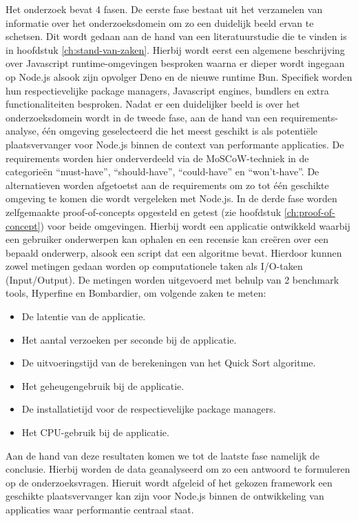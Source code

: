 Het onderzoek bevat 4 fasen. 
De eerste fase bestaat uit het verzamelen van informatie over het onderzoeksdomein om zo een duidelijk beeld ervan te schetsen.
Dit wordt gedaan aan de hand van een literatuurstudie die te vinden is in hoofdstuk \ref{ch:stand-van-zaken}. 
Hierbij wordt eerst een algemene beschrijving over Javascript runtime-omgevingen besproken waarna 
er dieper wordt ingegaan op Node.js alsook zijn opvolger Deno en de nieuwe runtime Bun. 
Specifiek worden hun respectievelijke package managers, Javascript engines, bundlers en extra functionaliteiten besproken.
Nadat er een duidelijker beeld is over het onderzoeksdomein wordt in de tweede fase, aan de hand van een requirements-analyse, 
één omgeving geselecteerd die het meest geschikt is als potentiële plaatsvervanger voor Node.js binnen de context van performante applicaties.
De requirements worden hier onderverdeeld via de MoSCoW-techniek in de categorieën “must-have”, “should-have”, “could-have” en “won't-have”. 
De alternatieven worden afgetoetst aan de requirements om zo tot één geschikte omgeving te komen die wordt vergeleken met Node.js.
In de derde fase worden zelfgemaakte proof-of-concepts opgesteld en getest (zie hoofdstuk \ref{ch:proof-of-concept}) voor beide omgevingen. 
Hierbij wordt een applicatie ontwikkeld waarbij een gebruiker onderwerpen kan ophalen en 
een recensie kan creëren over een bepaald onderwerp,
alsook een script dat een algoritme bevat. Hierdoor kunnen zowel metingen gedaan worden op computationele taken als I/O-taken (Input/Output).
De metingen worden uitgevoerd met behulp van 2 benchmark tools, Hyperfine en Bombardier, om volgende zaken te meten:
\begin{itemize}
    \item De latentie van de applicatie.
    \item Het aantal verzoeken per seconde bij de applicatie.
    \item De uitvoeringstijd van de berekeningen van het Quick Sort algoritme.
    \item Het geheugengebruik bij de applicatie.
    \item De installatietijd voor de respectievelijke package managers.
    \item Het CPU-gebruik bij de applicatie.
\end{itemize}
Aan de hand van deze resultaten komen we tot de laatste fase namelijk de conclusie. 
Hierbij worden de data geanalyseerd om zo een antwoord te formuleren op de onderzoeksvragen.
Hieruit wordt afgeleid of het gekozen framework een geschikte plaatsvervanger kan zijn voor Node.js binnen 
de ontwikkeling van applicaties waar performantie centraal staat.
